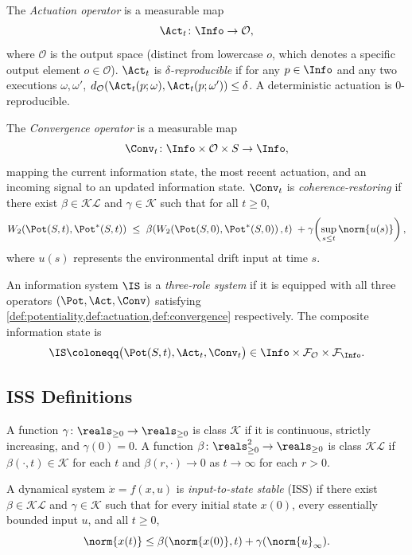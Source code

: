\begin{definition}[Actuation]\label{def:actuation}
The \emph{Actuation operator} is a measurable map
\[
  \Act_t\colon \Info \to \mathcal{O},
\]
where $\mathcal{O}$ is the output space (distinct from lowercase $o$,
which denotes a specific output element $o \in \mathcal{O}$).
$\Act_t$ is \emph{$\delta$-reproducible} if for any $p\in\Info$ and any two
executions $\omega,\omega'$,
$d_\mathcal{O}\!\left(\Act_t(p;\omega),\Act_t(p;\omega')\right)\leq\delta$.
A deterministic actuation is $0$-reproducible.
\end{definition}

\begin{definition}\label{def:convergence}
The \emph{Convergence operator} is a measurable map
\[
  \Conv_t\colon \Info \times \mathcal{O} \times S \to \Info,
\]
mapping the current information state, the most recent actuation, and an
incoming signal to an updated information state.
$\Conv_t$ is \emph{coherence-restoring} if there exist
$\beta\in\mathcal{KL}$ and $\gamma\in\mathcal{K}$ such that for all $t\geq 0$,
\[
  W_2\!\left(\Pot(S,t),\Pot^*(S,t)\right)
  \;\leq\;
  \beta\!\left(W_2\!\left(\Pot(S,0),\Pot^*(S,0)\right),t\right)
  \;+
  \gamma\!\left(\sup_{s\leq t}\norm{u(s)}\right),
\]
where $u(s)$ represents the environmental drift input at time $s$.
\end{definition}

\begin{definition}\label{def:tcccompliant}
An information system $\IS$ is a \emph{three-role system} if it is equipped
with all three operators $(\Pot,\Act,\Conv)$ satisfying
\cref{def:potentiality,def:actuation,def:convergence} respectively.
The composite information state is
\[
  \IS \coloneqq \bigl(\Pot(S,t),\Act_t,\Conv_t\bigr)
  \in \Info\times\mathcal{F}_\mathcal{O}\times\mathcal{F}_\Info.
\]
\end{definition}

\subsection{ISS Definitions}

\begin{definition}
A function $\gamma\colon\reals_{\geq 0}\to\reals_{\geq 0}$ is class
$\mathcal{K}$ if it is continuous, strictly increasing, and $\gamma(0)=0$.
A function $\beta\colon\reals_{\geq 0}^2\to\reals_{\geq 0}$ is class
$\mathcal{KL}$ if $\beta(\cdot,t)\in\mathcal{K}$ for each $t$ and
$\beta(r,\cdot)\to 0$ as $t\to\infty$ for each $r>0$.
\end{definition}

\begin{definition}\label{def:iss}
A dynamical system $\dot x = f(x,u)$ is \emph{input-to-state stable} (ISS)
if there exist $\beta\in\mathcal{KL}$ and $\gamma\in\mathcal{K}$ such that
for every initial state $x(0)$, every essentially bounded input $u$, and all
$t\ge 0$,
\[
  \norm{x(t)} \le \beta(\norm{x(0)},t) + \gamma(\norm{u}_\infty).
\]
\end{definition}
